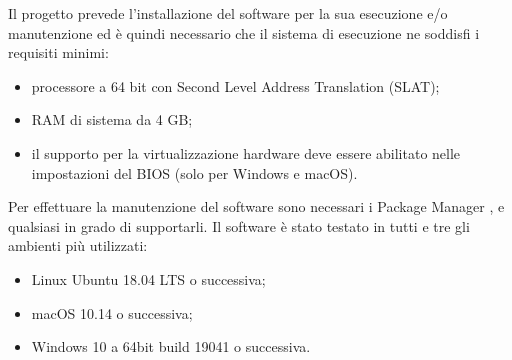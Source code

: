 Il progetto  prevede l'installazione del software  per la sua esecuzione e/o manutenzione ed è quindi necessario che il sistema di esecuzione ne soddisfi i requisiti minimi:
\begin{itemize}
	\item processore a 64 bit con Second Level Address Translation (SLAT);
	\item RAM di sistema da 4 GB;
	\item il supporto per la virtualizzazione hardware deve essere abilitato nelle impostazioni del BIOS (solo per Windows e macOS).
\end{itemize}
Per effettuare la manutenzione del software sono necessari i Package Manager ,  e qualsiasi  in grado di supportarli.
Il software è stato testato in tutti e tre gli ambienti più utilizzati:
\begin{itemize}
	\item Linux Ubuntu 18.04 LTS o successiva; 
	\item macOS 10.14 o successiva;
	\item Windows 10 a 64bit build 19041 o successiva.
\end{itemize}  
